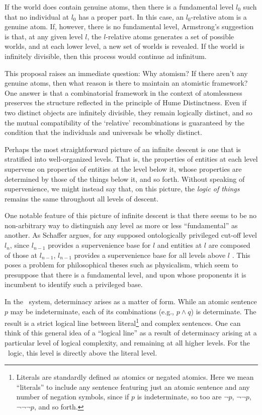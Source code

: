 If the world does contain genuine atoms, then there is a fundamental level $l_0$ such that no individual at $l_0$ has a proper part. In this case, an $l_0$-relative atom is a genuine atom. If, however, there is no fundamental level, Armstrong's suggestion is that, at any given level $l$, the $l$-relative atoms generates a set of possible worlds, and at each lower level, a new set of worlds is revealed. If the world is infinitely divisible, then this process would continue ad infinitum. 

This proposal raises an immediate question: Why atomism? If there aren't any genuine atoms, then what reason is there to maintain an atomistic framework? One answer is that a combinatorial framework in the context of atomlessness preserves the structure reflected in the principle of Hume Distinctness. Even if two distinct objects are infinitely divisible, they remain logically distinct, and so the mutual compatibility of the `relative' recombinations is guaranteed by the condition that the individuals and universals be wholly distinct. 

Perhaps the most straightforward picture of an infinite descent is one that is stratified into well-organized levels. That is, the properties of entities at each level supervene on properties of entities at the level below it, whose properties are determined by those of the things below it, and so forth. Without speaking of supervenience, we might instead say that, on this picture, the \emph{logic of things} remains the same throughout all levels of descent. 

One notable feature of this picture of infinite descent is that there seems to be no non-arbitrary way to distinguish any level as more or less ``fundamental'' as another. As Schaffer argues, for any supposed ontologically privileged cut-off level $l_n$, since $l_{n-1}$ provides a supervenience base for $l$ and entities at $l$ are composed of those at $l_{n-1}$, $l_{n-1}$ provides a supervenience base for all levels above $l$ \citeyear[p. 507]{Schaffer:03}. This poses a problem for philosophical theses such as physicalism, which seem to presuppose that there is a fundamental level, and upon whose proponents it is incumbent to identify such a privileged base.

In the \GO\ system, determinacy arises as a matter of form.  While an atomic sentence $p$ may be indeterminate, each of its combinations (e.g., $p\wedge q$) is determinate. The result is a strict logical line between literal\footnote{Literals are standardly defined as atomics or negated atomics. Here we mean ``literals'' to include any sentence featuring just an atomic sentence and any number of negation symbols, since if $p$ is indeterminate, so too are $\neg p$, $\neg \neg p$, $\neg \neg\neg p$, and so forth.} and complex sentences. One can think of this general idea of a ``logical line'' as a result of determinacy arising at a particular level of logical complexity, and remaining at all higher levels. For the \GO\ logic, this level is directly above the literal level.

